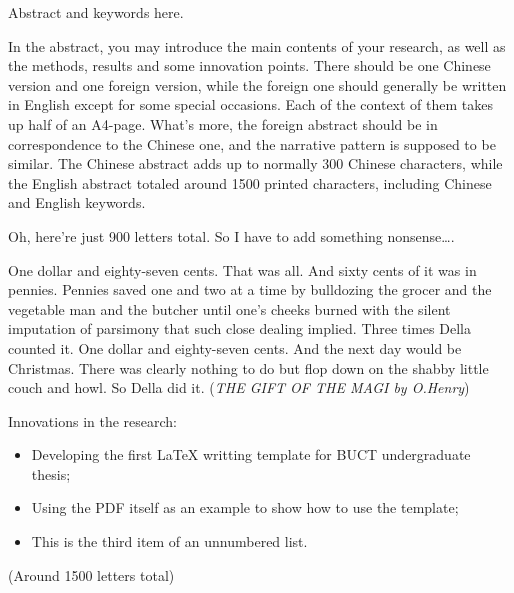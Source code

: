 \begin{abstracten}
	Abstract and keywords here.

	In the abstract, you may introduce the main contents of your research,
	as well as the methods, results and some innovation points. There should
	be one Chinese version and one foreign version, while the foreign one
	should generally be written in English except for some special occasions.
	Each of the context of them takes up half of an A4-page. What's more,
	the foreign abstract should be in correspondence to the Chinese one,
	and the narrative pattern is supposed to be similar. The Chinese abstract
	adds up to normally 300 Chinese characters, while the English abstract
	totaled around 1500 printed characters, including Chinese and English keywords.

	Oh, here're just 900 letters total. So I have to add something nonsense\dots.

	One dollar and eighty-seven cents. That was all. And sixty cents of it was
	in pennies. Pennies saved one and two at a time by bulldozing the grocer
	and the vegetable man and the butcher until one's cheeks burned with the
	silent imputation of parsimony that such close dealing implied. Three times
	Della counted it. One dollar and eighty-seven cents. And the next day would
	be Christmas. There was clearly nothing to do but flop down on the shabby
	little couch and howl. So Della did it.
	(\textit{THE GIFT OF THE MAGI by O.Henry})

	Innovations in the research:
	\begin{itemize}
		\item Developing the first \LaTeX{} writting template for BUCT undergraduate thesis;
		\item Using the PDF itself as an example to show how to use the template;
		\item This is the third item of an unnumbered list.
	\end{itemize}

	(Around 1500 letters total)
\end{abstracten}